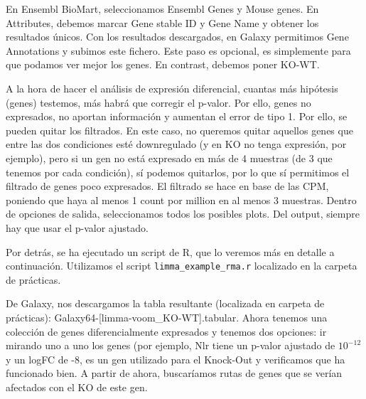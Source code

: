 En Ensembl BioMart, seleccionamos Ensembl Genes y Mouse genes. En Attributes, debemos marcar Gene stable ID y Gene Name y obtener los resultados únicos. Con los resultados descargados, en Galaxy permitimos Gene Annotations y subimos este fichero. Este paso es opcional, es simplemente para que podamos ver mejor los genes. En contrast, debemos poner KO-WT.

A la hora de hacer el análisis de expresión diferencial, cuantas más hipótesis (genes) testemos, más habrá que corregir el p-valor. Por ello, genes no expresados, no aportan información y aumentan el error de tipo 1. Por ello, se pueden quitar los filtrados. En este caso, no queremos quitar aquellos genes que entre las dos condiciones esté downregulado (y en KO no tenga expresión, por ejemplo), pero si un gen no está expresado en más de 4 muestras (de 3 que tenemos por cada condición), sí podemos quitarlos, por lo que sí permitimos el filtrado de genes poco expresados. El filtrado se hace en base de las CPM, poniendo que haya al menos 1 count por million en al menos 3 muestras. Dentro de opciones de salida, seleccionamos todos los posibles plots. 
Del output, siempre hay que usar el p-valor ajustado. 

Por detrás, se ha ejecutado un script de R, que lo veremos más en detalle a continuación. Utilizamos el script \texttt{limma\_example\_rma.r} localizado en la carpeta de prácticas. 

De Galaxy, nos descargamos la tabla resultante (localizada en carpeta de prácticas): Galaxy64-[limma-voom\_KO-WT].tabular. 
Ahora tenemos una colección de genes diferencialmente expresados y tenemos dos opciones: ir mirando uno a uno los genes (por ejemplo, Nlr tiene un p-valor ajustado de $10^{-12}$ y un logFC de -8, es un gen utilizado para el Knock-Out y verificamos que ha funcionado bien. A partir de ahora, buscaríamos rutas de genes que se verían afectados con el KO de este gen. 

